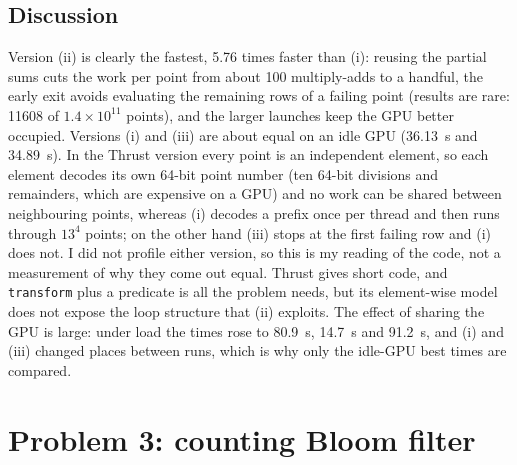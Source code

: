 \documentclass[11pt]{article}
\begin{document}
\subsection*{Discussion}
Version (ii) is clearly the fastest, 5.76 times faster than (i): reusing the
partial sums cuts the work per point from about 100 multiply-adds to a handful,
the early exit avoids evaluating the remaining rows of a failing point (results
are rare: 11608 of $1.4\times10^{11}$ points), and the larger launches keep
the GPU better occupied. Versions (i) and (iii) are about equal on an idle GPU
(36.13~s and 34.89~s). In the Thrust version every point is an independent
element, so each element decodes its own 64-bit point number (ten 64-bit
divisions and remainders, which are expensive on a GPU) and no work can be
shared between neighbouring points, whereas (i) decodes a prefix once per
thread and then runs through $13^4$ points; on the other hand (iii) stops at
the first failing row and (i) does not. I did not profile either version, so
this is my reading of the code, not a measurement of why they come out equal.
Thrust gives short code, and \texttt{transform} plus a predicate is all the
problem needs, but its element-wise model does not expose the loop structure
that (ii) exploits. The effect of sharing the GPU is large: under load the
times rose to 80.9~s, 14.7~s and 91.2~s, and (i) and (iii) changed places
between runs, which is why only the idle-GPU best times are compared.

\section*{Problem 3: counting Bloom filter}
\end{document}
